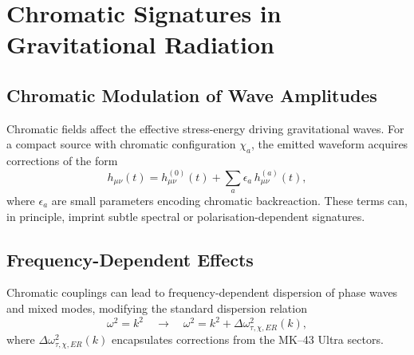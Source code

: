 \chapter{Chromatic Signatures in Gravitational Radiation}

\section{Chromatic Modulation of Wave Amplitudes}

Chromatic fields affect the effective stress-energy driving gravitational waves.
For a compact source with chromatic configuration $\chi_a$, the emitted waveform acquires corrections of the form
\[
h_{\mu\nu}(t)
=
h^{(0)}_{\mu\nu}(t)
+
\sum_a \epsilon_a\, h^{(a)}_{\mu\nu}(t),
\]
where $\epsilon_a$ are small parameters encoding chromatic backreaction.
These terms can, in principle, imprint subtle spectral or polarisation-dependent signatures.

\section{Frequency-Dependent Effects}

Chromatic couplings can lead to frequency-dependent dispersion of phase waves and mixed modes, modifying the standard dispersion relation
\[
\omega^2 = k^2 \quad \longrightarrow \quad
\omega^2 = k^2 + \Delta\omega^2_{\tau,\chi,ER}(k),
\]
where $\Delta\omega^2_{\tau,\chi,ER}(k)$ encapsulates corrections from the MK--43 Ultra sectors.

